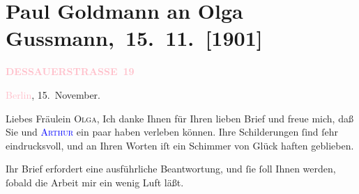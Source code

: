 

\renewcommand{\erwaehntePersonen}{Personen: Paul Goldmann, Gerhart Hauptmann, Olga Schnitzler, Elisabeth Steinrück}
\renewcommand{\erwaehnteOrte}{Orte: Berlin, Dessauer Straße, Hotel Edlacherhof, Wien}
\renewcommand{\erwaehnteWerke}{Werke: Berliner Brief. [»Schluck und Jau« von Gerhart Hauptmann am Deutschen Theater], Berliner Theater. »Einsame Menschen« im Deutschen Theater, Einsame Menschen. Drama, Neue Freie Presse, »Michael Kramer.«}
\section[ Paul Goldmann an Olga Gussmann, 15. 11. {[}1901{]}]{Paul Goldmann an Olga Gussmann, 15. 11. {[}1901{]}}
\nopagebreak{}
\rehead{ }\normalsize\beginnumbering{}
\toendnotes[C]{\smallbreak\pagebreak[2]}
\toendnotes[C]{\smallbreak}
\pstart
           \noindent{}\raggedleft{}{\pb}\textcolor{gray}{\textbf{\textcolor{pink}{DESSAUERSTRASSE 19}{}\ledrightnote{\textcolor{pink}{Dessauer Straße}}}}\pend
           
\pstart
           \textcolor{pink}{Berlin}{}\ledrightnote{\textcolor{pink}{Berlin}}, 15. November.\pend
           
\pstart{}Liebes Fräulein \textsc{Olga},\pend
\pstart
           Ich danke Ihnen für Ihren lieben Brief und freue mich, daß Sie und \textsc{\textcolor{blue}{Arthur}{}\ledrightnote{}} ein paar \label{K_L03535-1v}\label{K_L03535-1h} haben
               verleben können. Ihre Schilderungen ſind ſehr eindrucksvoll, und an Ihren Worten iſt
               ein Schimmer von Glück haften geblieben.\pend
           
\pstart
           Ihr Brief erfordert eine ausführliche Beantwortung, und ſie ſoll Ihnen werden, ſobald
               die Arbeit mir ein wenig Luft läßt.\pend
           
